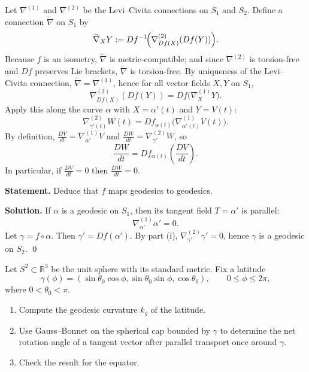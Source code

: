 \begin{solution}
Let $\nabla^{(1)}$ and $\nabla^{(2)}$ be the Levi--Civita connections on $S_1$ and $S_2$.
		Define a connection $\widetilde{\nabla}$ on $S_1$ by
		\[
		\widetilde{\nabla}_X Y := Df^{-1}\!\Bigl(\nabla^{(2)}_{Df(X)}(Df(Y))\Bigr).
		\]
		Because $f$ is an isometry, $\widetilde{\nabla}$ is metric-compatible; and since $\nabla^{(2)}$ is torsion-free and
		$Df$ preserves Lie brackets, $\widetilde{\nabla}$ is torsion-free. By uniqueness of the Levi--Civita connection,
		$\widetilde{\nabla}=\nabla^{(1)}$, hence for all vector fields $X,Y$ on $S_1$,
		\[
		\nabla^{(2)}_{Df(X)}(Df(Y)) = Df\bigl(\nabla^{(1)}_X Y\bigr).
		\]
		Apply this along the curve $\alpha$ with $X=\alpha'(t)$ and $Y=V(t)$:
		\[
		\nabla^{(2)}_{\gamma'(t)}W(t) = Df_{\alpha(t)}\!\bigl(\nabla^{(1)}_{\alpha'(t)}V(t)\bigr).
		\]
		By definition, $\frac{DV}{dt}=\nabla^{(1)}_{\alpha'}V$ and $\frac{DW}{dt}=\nabla^{(2)}_{\gamma'}W$, so
		\[
		\frac{DW}{dt} = Df_{\alpha(t)}\!\left(\frac{DV}{dt}\right).
		\]
		In particular, if $\frac{DV}{dt}=0$ then $\frac{DW}{dt}=0$.
		
		\par\smallskip\noindent\textbullet\enspace 
		\textbf{Statement.} Deduce that $f$ maps geodesics to geodesics.
		
		\bigskip
		\textbf{Solution.}
		If $\alpha$ is a geodesic on $S_1$, then its tangent field $T=\alpha'$ is parallel:
		\[
		\nabla^{(1)}_{\alpha'}\alpha' = 0.
		\]
		Let $\gamma=f\circ\alpha$. Then $\gamma' = Df(\alpha')$. By part (i),
		$\nabla^{(2)}_{\gamma'}\gamma' = 0$, hence $\gamma$ is a geodesic on $S_2$.
		\qed
\end{solution}

\begin{problem}
\label{prob:cp-vii-0072}
Let \(S^2\subset\mathbb{R}^3\) be the unit sphere with its standard metric.
Fix a latitude
\[
\gamma(\phi)=
(\sin\theta_0\cos\phi,\sin\theta_0\sin\phi,\cos\theta_0),
\qquad 0\le \phi\le 2\pi,
\]
where \(0<\theta_0<\pi\).

\begin{enumerate}
\item Compute the geodesic curvature \(k_g\) of the latitude.
\item Use Gauss--Bonnet on the spherical cap bounded by \(\gamma\) to determine
the net rotation angle of a tangent vector after parallel transport once
around \(\gamma\).
\item Check the result for the equator.
\end{enumerate}
\end{problem}


